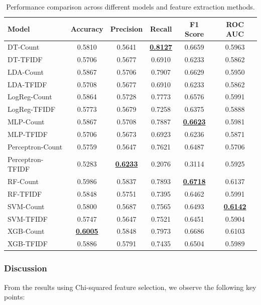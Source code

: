 \begin{table}[H]
\centering
\begin{tabular}{|l|c|c|c|c|c|}
\hline
\textbf{Model} & \textbf{Accuracy} & \textbf{Precision} & \textbf{Recall} & \textbf{F1 Score} & \textbf{ROC AUC} \\
\hline
DT-Count & 0.5810 & 0.5641 & \underline{\textbf{0.8127}} & 0.6659 & 0.5963 \\
DT-TFIDF & 0.5706 & 0.5677 & 0.6910 & 0.6233 & 0.5862 \\
LDA-Count & 0.5867 & 0.5706 & 0.7907 & 0.6629 & 0.5950 \\
LDA-TFIDF & 0.5708 & 0.5677 & 0.6910 & 0.6233 & 0.5862 \\
LogReg-Count & 0.5864 & 0.5728 & 0.7773 & 0.6576 & 0.5991 \\
LogReg-TFIDF & 0.5773 & 0.5679 & 0.7258 & 0.6375 & 0.5888 \\
MLP-Count & 0.5867 & 0.5708 & 0.7887 & \underline{\textbf{0.6623}} & 0.5981 \\
MLP-TFIDF & 0.5706 & 0.5673 & 0.6923 & 0.6236 & 0.5871 \\
Perceptron-Count & 0.5759 & 0.5647 & 0.7621 & 0.6487 & 0.5706 \\
Perceptron-TFIDF & 0.5283 & \underline{\textbf{0.6233}} & 0.2076 & 0.3114 & 0.5925 \\
RF-Count & 0.5986 & 0.5837 & 0.7893 & \underline{\textbf{0.6718}} & 0.6137 \\
RF-TFIDF & 0.5848 & 0.5751 & 0.7395 & 0.6462 & 0.5991 \\
SVM-Count & 0.5800 & 0.5687 & 0.7565 & 0.6493 & \underline{\textbf{0.6142}} \\
SVM-TFIDF & 0.5747 & 0.5647 & 0.7521 & 0.6451 & 0.5904 \\
XGB-Count & \underline{\textbf{0.6005}} & 0.5848 & 0.7973 & 0.6686 & 0.6103 \\
XGB-TFIDF & 0.5886 & 0.5791 & 0.7435 & 0.6504 & 0.5989 \\
\hline
\end{tabular}
\caption{Performance comparison across different models and feature extraction methods.}
\label{tab:full_results}
\end{table}

\subsubsection{Discussion}

From the results using Chi-squared feature selection, we observe the following key points:

